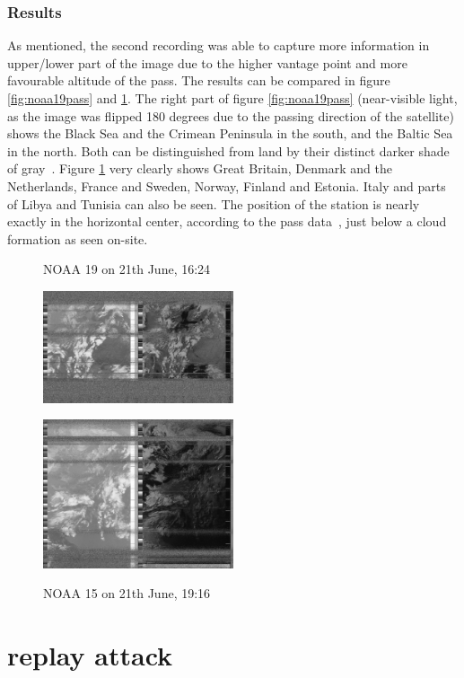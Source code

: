 \documentclass[conference]{IEEEtran}
\begin{document}
\subsubsection{Results}
As mentioned, the second recording was able to capture more information in upper/lower part of the image due to the higher vantage point and more favourable altitude of the pass. The results can be compared in figure \ref{fig:noaa19pass} and \ref{fig:noaa15pass}. The right part of figure \ref{fig:noaa19pass} (near-visible light, as the image was flipped 180 degrees due to the passing direction of the satellite) shows the Black Sea and the Crimean Peninsula in the south, and the Baltic Sea in the north. Both can be distinguished from land by their distinct darker shade of gray~\cite[42]{NOAA19building}. Figure \ref{fig:noaa15pass} very clearly shows Great Britain, Denmark and the Netherlands, France and Sweden, Norway, Finland and Estonia. Italy and parts of Libya and Tunisia can also be seen. The position of the station is nearly exactly in the horizontal center, according to the pass data~\cite{heavensabove19noaa15}, just below a cloud formation as seen on-site. 
\begin{figure}
	\centering
	\caption{NOAA 19 on 21th June, 16:24}
	\includegraphics[width=0.5\textwidth]{noaa19_21-06-2019_1624} \label{fig:noaa19pass}
	\caption{NOAA 15 on 21th June, 19:16}
	\includegraphics[width=0.5\textwidth]{noaa15_21-06-2019-1916} \label{fig:noaa15pass}
\end{figure}

\section{replay attack} %
\label{replayattack}
\end{document}
